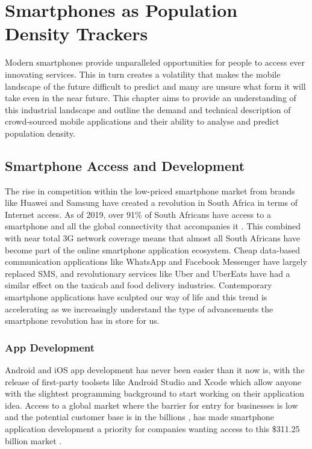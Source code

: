 \chapter{Smartphones as Population Density Trackers}
\label{chap:lit-review}
Modern smartphones provide unparalleled opportunities for people to access ever innovating services. This in turn creates a volatility that makes the mobile landscape of the future difficult to predict and many are unsure what form it will take even in the near future. This chapter aims to provide an understanding of this industrial landscape and outline the demand and technical description of crowd-sourced mobile applications and their ability to analyse and predict population density.

\section{Smartphone Access and Development}

The rise in competition within the low-priced smartphone market from brands like Huawei and Samsung have created a revolution in South Africa in terms of Internet access. As of 2019, over 91\% of South Africans have access to a smartphone and all the global connectivity that accompanies it \cite{ICASA2020}. This combined with near total 3G network coverage \cite{ICASA2020} means that almost all South Africans have become part of the online smartphone application ecosystem. Cheap data-based communication applications like WhatsApp and Facebook Messenger have largely replaced SMS, and revolutionary services like Uber and UberEats have had a similar effect on the taxicab and food delivery industries. Contemporary smartphone applications have sculpted our way of life and this trend is accelerating as we increasingly understand the type of advancements the smartphone revolution has in store for us.

\subsection{App Development}
Android and iOS app development has never been easier than it now is, with the release of first-party toolsets like Android Studio and Xcode which allow anyone with the slightest programming background to start working on their application idea. Access to a global market where the barrier for entry for businesses is low and the potential customer base is in the billions \cite{Turner}, has made smartphone application development a priority for companies wanting access to this \$311.25 billion market \cite{AlliedMarketResearch2019}.

